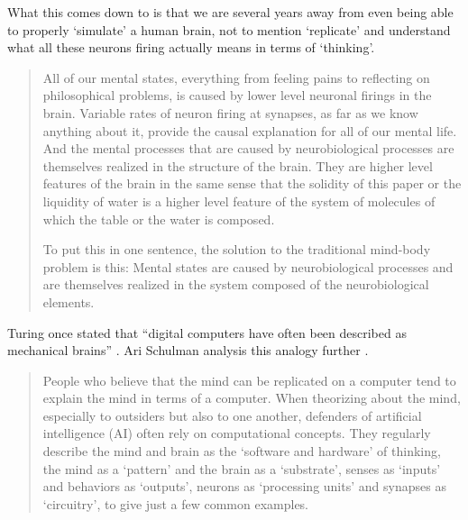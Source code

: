 What this comes down to is that we are several years away from even being able to properly `simulate' a human brain, not to mention `replicate' and understand what all these neurons firing actually means in terms of `thinking'. 

\begin{quotation}
  All of our mental states, everything from feeling pains to reflecting on philosophical problems, is caused by lower level neuronal firings in the brain. Variable rates of neuron firing at synapses, as far as we know anything about it, provide the causal explanation for all of our mental life. And the mental processes that are caused by neurobiological processes are themselves realized in the structure of the brain. They are higher level features of the brain in the same sense that the solidity of this paper or the liquidity of water is a higher level feature of the system of molecules of which the table or the water is composed.

  To put this in one sentence, the solution to the traditional mind-body problem is this: Mental states are caused by neurobiological processes and are themselves realized in the system composed of the neurobiological elements.
\end{quotation}

Turing once stated that ``digital computers have often been described as mechanical brains'' \autocite*{Turing1951}. Ari Schulman analysis this analogy further \autocite*{Schulman2009}.

\begin{quotation}
  People who believe that the mind can be replicated on a computer tend to explain the mind in terms of a computer. When theorizing about the mind, especially to outsiders but also to one another, defenders of artificial intelligence (AI) often rely on computational concepts. They regularly describe the mind and brain as the `software and hardware' of thinking, the mind as a `pattern' and the brain as a `substrate', senses as `inputs' and behaviors as `outputs', neurons as `processing units' and synapses as `circuitry', to give just a few common examples. 
\end{quotation}




